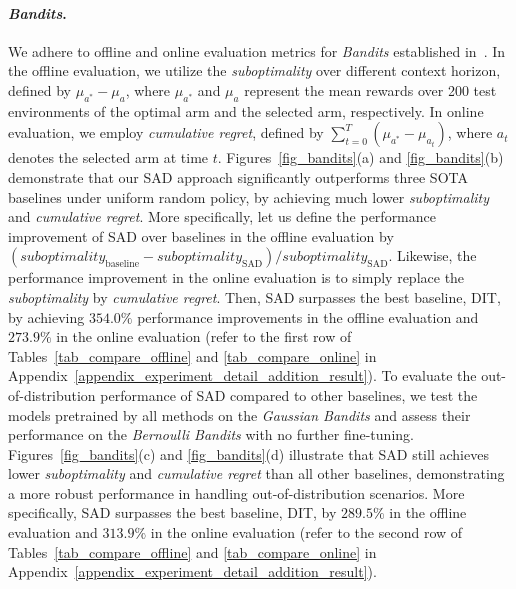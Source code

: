 \paragraph{\textit{Bandits}.}
%
We adhere to offline and online evaluation metrics for \textit{Bandits} established in~\citep{lee2024supervised}. In the offline evaluation, we utilize the \textit{suboptimality} over different context horizon, defined by $\mu_{a^*} - \mu_a$, where $\mu_{a^*}$ and $\mu_a$ represent the mean rewards over 200 test environments of the optimal arm and the selected arm, respectively. In online evaluation, we employ \textit{cumulative regret}, defined by $\sum_{t=0}^T (\mu_{a^*} - \mu_{a_t})$,
%
%
where $a_t$ denotes the selected arm at time $t$.
%
Figures~\ref{fig_bandits}(a) and \ref{fig_bandits}(b) demonstrate that our SAD approach significantly outperforms three SOTA baselines under uniform random policy, by achieving much lower \textit{suboptimality} and \textit{cumulative regret}.
%
More specifically, let us define the performance improvement of SAD over baselines in the offline evaluation by 
$(suboptimality_\text{baseline} - suboptimality_\text{SAD}) / suboptimality_\text{SAD}$.
%
Likewise, the performance improvement in the online evaluation is to simply replace the \textit{suboptimality} by \textit{cumulative regret}. Then, SAD surpasses the best baseline, DIT, by achieving $354.0\%$ performance improvements in the offline evaluation and $273.9\%$ in the online evaluation (refer to the first row of Tables~\ref{tab_compare_offline} and \ref{tab_compare_online} in Appendix~\ref{appendix_experiment_detail_addition_result}).
%
To evaluate the out-of-distribution performance of SAD compared to other baselines, we test the models pretrained by all methods on the \textit{Gaussian Bandits} and assess their performance on the \textit{Bernoulli Bandits} with no further fine-tuning. Figures~\ref{fig_bandits}(c) and \ref{fig_bandits}(d) illustrate that SAD still achieves lower \textit{suboptimality} and \textit{cumulative regret} than all other baselines, demonstrating a more robust performance in handling out-of-distribution scenarios.
%
More specifically, SAD surpasses the best baseline, DIT, by $289.5\%$ in the offline evaluation and $313.9\%$ in the online evaluation (refer to the second row of Tables~\ref{tab_compare_offline} and \ref{tab_compare_online} in Appendix~\ref{appendix_experiment_detail_addition_result}).


